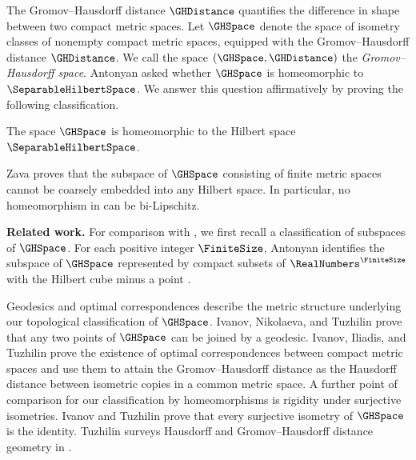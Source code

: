 The Gromov--Hausdorff distance
$\GHDistance$
quantifies the difference in shape between
two compact metric spaces.
Let
$\GHSpace$
denote the space of isometry classes of nonempty compact metric spaces,
equipped with the Gromov--Hausdorff distance
$\GHDistance$.
We call
the space
$(\GHSpace, \GHDistance)$
the \emph{Gromov--Hausdorff space}.
Antonyan
\cite[p.~2]{Antonyan2020Euclidean}
asked whether
$\GHSpace$
 is homeomorphic to
$\SeparableHilbertSpace$.
We answer this question affirmatively by proving the following classification.

\begin{theorem}\label{thm:main}
The space
$\GHSpace$
is homeomorphic to the Hilbert space
$\SeparableHilbertSpace$.
\end{theorem}

Zava
\cite[arXiv v3, Theorem~B]{Zava2025Coarse}
proves that the subspace of
$\GHSpace$
consisting of finite metric spaces cannot be coarsely embedded into any
Hilbert space.
In particular,
no homeomorphism in  can be bi-Lipschitz.

\medskip
\noindent\textbf{Related work.}
For comparison with ,
we first recall a classification of subspaces of
$\GHSpace$.
For each positive integer
$\FiniteSize $,
Antonyan identifies the subspace of
$\GHSpace$
represented by compact subsets of
$\RealNumbers^\FiniteSize $
with the Hilbert cube minus a point
\cite[Corollary~5.3]{Antonyan2021Euclidean}.

Geodesics and optimal correspondences describe the metric structure
underlying our topological classification of
$\GHSpace$.
Ivanov,
Nikolaeva,
and Tuzhilin
\cite[arXiv v1, Theorem~1]{IvanovNikolaevaTuzhilin2015}
prove that any two points of
$\GHSpace$
can be joined by a geodesic.
Ivanov,
Iliadis,
and Tuzhilin
\cite[arXiv v1, Theorem~2.6 and Corollary~2.7]{IvanovIliadisTuzhilin2016}
prove the existence of optimal correspondences between compact metric spaces
and use them to attain the Gromov--Hausdorff distance as the Hausdorff distance
between isometric copies in a common metric space.
A further point of comparison for our classification by homeomorphisms
is rigidity under surjective isometries.
Ivanov and Tuzhilin
\cite[Main Theorem]{IvanovTuzhilin2019Isometries}
prove that every surjective isometry of
$\GHSpace$
is the identity.
Tuzhilin surveys Hausdorff and Gromov--Hausdorff distance geometry in
\cite{Tuzhilin2020}.

